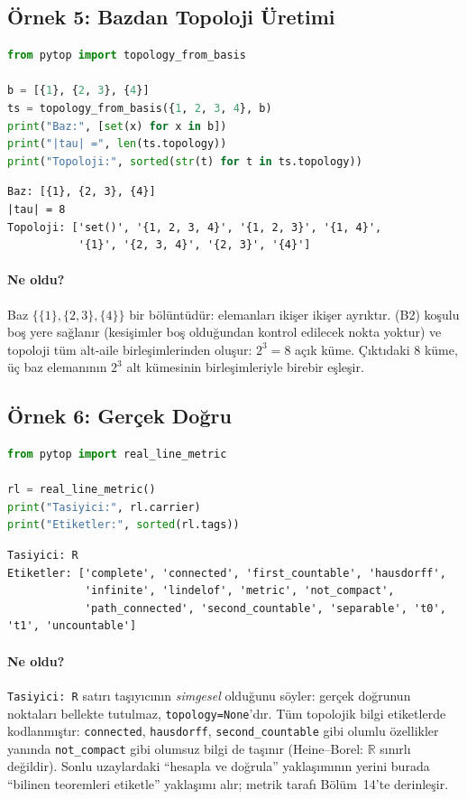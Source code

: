\subsection{Örnek 5: Bazdan Topoloji Üretimi}

\begin{lstlisting}[language=Python, caption={Bazdan topoloji}]
from pytop import topology_from_basis

b = [{1}, {2, 3}, {4}]
ts = topology_from_basis({1, 2, 3, 4}, b)
print("Baz:", [set(x) for x in b])
print("|tau| =", len(ts.topology))
print("Topoloji:", sorted(str(t) for t in ts.topology))
\end{lstlisting}

\begin{lstlisting}[caption={Çıktı}]
Baz: [{1}, {2, 3}, {4}]
|tau| = 8
Topoloji: ['set()', '{1, 2, 3, 4}', '{1, 2, 3}', '{1, 4}',
           '{1}', '{2, 3, 4}', '{2, 3}', '{4}']
\end{lstlisting}

\paragraph{Ne oldu?}
Baz $\{\{1\},\{2,3\},\{4\}\}$ bir bölüntüdür: elemanları ikişer ikişer
ayrıktır. (B2) koşulu boş yere sağlanır (kesişimler boş olduğundan
kontrol edilecek nokta yoktur) ve topoloji tüm alt-aile
birleşimlerinden oluşur: $2^3=8$ açık küme. Çıktıdaki 8 küme, üç baz
elemanının $2^3$ alt kümesinin birleşimleriyle birebir eşleşir.

\subsection{Örnek 6: Gerçek Doğru}

\begin{lstlisting}[language=Python, caption={Gerçek doğru}]
from pytop import real_line_metric

rl = real_line_metric()
print("Tasiyici:", rl.carrier)
print("Etiketler:", sorted(rl.tags))
\end{lstlisting}

\begin{lstlisting}[caption={Çıktı}]
Tasiyici: R
Etiketler: ['complete', 'connected', 'first_countable', 'hausdorff',
            'infinite', 'lindelof', 'metric', 'not_compact',
            'path_connected', 'second_countable', 'separable', 't0', 't1', 'uncountable']
\end{lstlisting}

\paragraph{Ne oldu?}
\texttt{Tasiyici: R} satırı taşıyıcının \emph{simgesel} olduğunu söyler:
gerçek doğrunun noktaları bellekte tutulmaz, \texttt{topology=None}'dır.
Tüm topolojik bilgi etiketlerde kodlanmıştır: \texttt{connected},
\texttt{hausdorff}, \texttt{second\_countable} gibi olumlu özellikler
yanında \texttt{not\_compact} gibi olumsuz bilgi de taşınır
(Heine--Borel: $\mathbb{R}$ sınırlı değildir). Sonlu uzaylardaki
``hesapla ve doğrula'' yaklaşımının yerini burada ``bilinen teoremleri
etiketle'' yaklaşımı alır; metrik tarafı Bölüm~14'te derinleşir.


